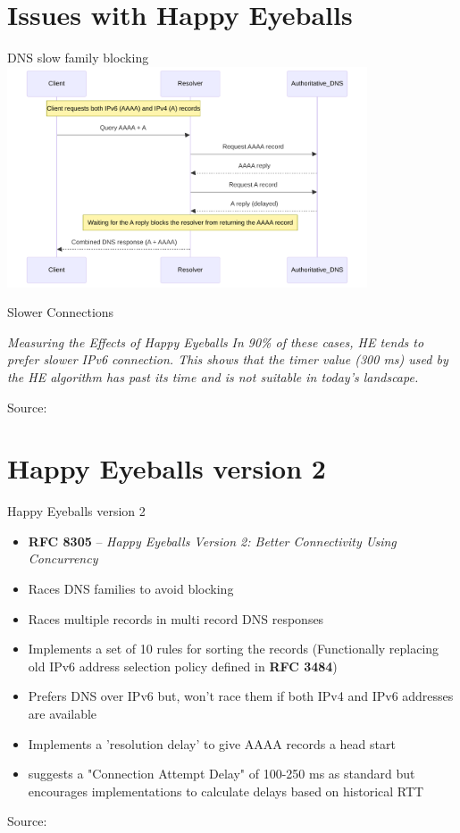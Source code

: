 \documentclass[aspectratio=169]{beamer}
\begin{document}
\section{Issues with Happy Eyeballs}
\begin{frame}{DNS slow family blocking}
  \centering
  \includegraphics[width=0.8\textwidth]{sfblocking.pdf}
\end{frame}

\begin{frame}{Slower Connections}
\begin{block}{\textit{Measuring the Effects of Happy Eyeballs}}
\vspace{0.5em}
\textit{In 90\% of these cases, HE
tends to prefer slower IPv6 connection. This shows that the timer
value (300 ms) used by the HE algorithm has past its time and is
not suitable in today’s landscape.}
\end{block}
  \centering
  {\tiny Source: \parencite{bajpaiMeasuringEffectsHappy2016}}
\end{frame}

\section{Happy Eyeballs version 2}
\begin{frame}{Happy Eyeballs version 2}
  \begin{itemize}
    \item \textbf{RFC 8305} – \emph{Happy Eyeballs Version 2: Better Connectivity Using Concurrency}
    \item Races DNS families to avoid blocking
    \item Races multiple records in multi record DNS responses
    \item Implements a set of 10 rules for sorting the records (Functionally replacing old IPv6 address selection policy defined in \textbf{RFC 3484})
    \item Prefers DNS over IPv6 but, won't race them if both IPv4 and IPv6 addresses are available
    \item Implements a 'resolution delay' to give AAAA records a head start
    \item suggests a "Connection Attempt Delay" of 100-250 ms as standard but encourages implementations to calculate delays based on historical RTT
  \end{itemize}
  \centering
  {\tiny Source: \parencite{schinaziHappyEyeballsVersion2017}}
\end{frame}
\end{document}

